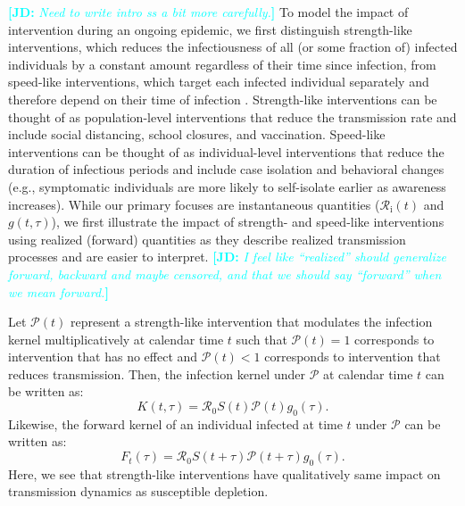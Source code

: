 \documentclass[12pt]{article}
\newcommand{\comment}{\showcomment}
\newcommand{\showcomment}[3]{\textcolor{#1}{\textbf{[#2: }\textsl{#3}\textbf{]}}}
\newcommand{\jd}[1]{\comment{cyan}{JD}{#1}}
\newcommand{\Rx}[1]{\ensuremath{{\mathcal R}_{#1}}\xspace}
\newcommand{\Ro}{\Rx{0}}
\newcommand{\Ri}{\Rx{\mathrm{i}}}
\newcommand{\PP}{{\mathcal P}}
\begin{document}
\jd{Need to write intro ss a bit more carefully.}
To model the impact of intervention during an ongoing epidemic, we first distinguish strength-like interventions, which reduces the infectiousness of all (or some fraction of) infected individuals by a constant amount regardless of their time since infection, from speed-like interventions, which target each infected individual separately and therefore depend on their time of infection \citep{dushoff2021speed}.
Strength-like interventions can be thought of as population-level interventions that reduce the transmission rate and include social distancing, school closures, and vaccination.
Speed-like interventions can be thought of as individual-level interventions that reduce the duration of infectious periods and include case isolation and behavioral changes (e.g., symptomatic individuals are more likely to self-isolate earlier as awareness increases).
While our primary focuses are instantaneous quantities ($\Ri(t)$ and $g(t, \tau)$), we first illustrate the impact of strength- and speed-like interventions using realized (forward) quantities as they describe realized transmission processes and are easier to interpret.
\jd{I feel like ``realized'' should generalize forward, backward and maybe censored, and that we should say ``forward'' when we mean forward.}

Let $\PP(t)$ represent a strength-like intervention that modulates the infection kernel multiplicatively at calendar time $t$ such that $\PP(t)=1$ corresponds to intervention that has no effect and $\PP(t) < 1$ corresponds to intervention that reduces transmission.
Then, the infection kernel under $\PP$ at calendar time $t$ can be written as:
\begin{equation}
K(t, \tau) = \Ro S(t) \PP(t) g_0(\tau).
\end{equation}
Likewise, the forward kernel of an individual infected at time $t$ under $\PP$ can be written as:
\begin{equation}
F_t(\tau) =  \Ro S(t+\tau) \PP(t + \tau) g_0(\tau).
\end{equation}
Here, we see that strength-like interventions have qualitatively same impact on transmission dynamics as susceptible depletion.
\end{document}
